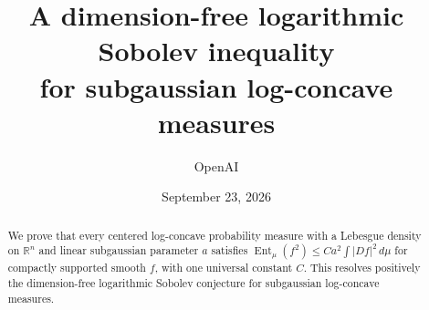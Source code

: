 \documentclass[11pt]{article}
\title{A dimension-free logarithmic Sobolev inequality\\
for subgaussian log-concave measures}
\author{OpenAI}
\date{September 23, 2026}
\theoremstyle{definition}
\theoremstyle{remark}
\numberwithin{equation}{section}
\newcommand{\1}{\mathbf 1}
\begin{document}
\maketitle
\begin{abstract}
We prove that every centered log-concave probability measure with a
Lebesgue density on $\mathbb R^n$ and linear subgaussian parameter $a$
satisfies $\operatorname{Ent}_\mu(f^2)\le Ca^2\int|Df|^2\,d\mu$
for compactly supported smooth $f$, with one universal constant $C$.
This resolves positively the dimension-free logarithmic Sobolev conjecture
for subgaussian log-concave measures.
\end{abstract}

\newpage







\begingroup
\raggedright

\endgroup
\end{document}
